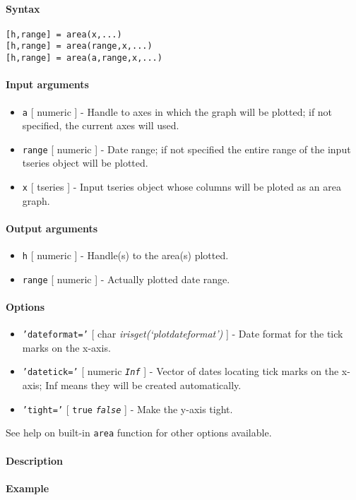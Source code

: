 


	\paragraph{Syntax}

\begin{verbatim}
[h,range] = area(x,...)
[h,range] = area(range,x,...)
[h,range] = area(a,range,x,...)
\end{verbatim}

\paragraph{Input arguments}

\begin{itemize}
\item
  \texttt{a} {[} numeric {]} - Handle to axes in which the graph will be
  plotted; if not specified, the current axes will used.
\item
  \texttt{range} {[} numeric {]} - Date range; if not specified the
  entire range of the input tseries object will be plotted.
\item
  \texttt{x} {[} tseries {]} - Input tseries object whose columns will
  be ploted as an area graph.
\end{itemize}

\paragraph{Output arguments}

\begin{itemize}
\item
  \texttt{h} {[} numeric {]} - Handle(s) to the area(s) plotted.
\item
  \texttt{range} {[} numeric {]} - Actually plotted date range.
\end{itemize}

\paragraph{Options}

\begin{itemize}
\item
  \texttt{'dateformat='} {[} char \textbar{}
  \emph{irisget(`plotdateformat')} {]} - Date format for the tick marks
  on the x-axis.
\item
  \texttt{'datetick='} {[} numeric \textbar{} \emph{\texttt{Inf}} {]} -
  Vector of dates locating tick marks on the x-axis; Inf means they will
  be created automatically.
\item
  \texttt{'tight='} {[} \texttt{true} \textbar{} \emph{\texttt{false}}
  {]} - Make the y-axis tight.
\end{itemize}

See help on built-in \texttt{area} function for other options available.

\paragraph{Description}

\paragraph{Example}


